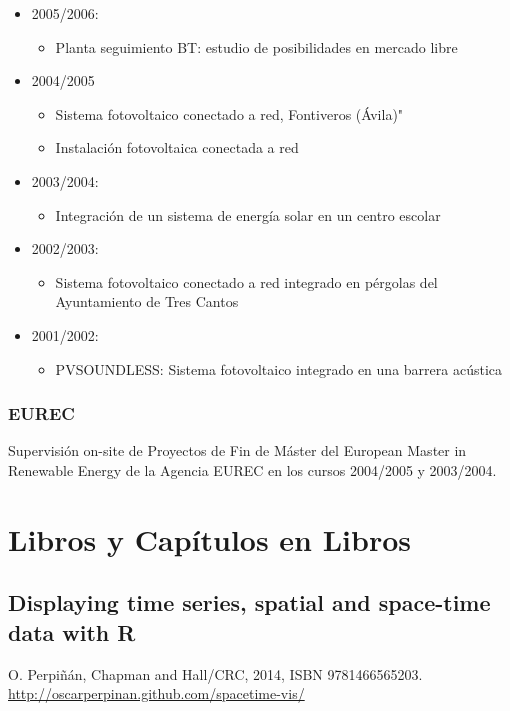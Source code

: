 \documentclass[article, a4paper]{memoir}
\begin{document}
\begin{itemize}
\begin{itemize}
\end{itemize}
\item 2005/2006:
\begin{itemize}
\item \guillemotleft{}Planta seguimiento BT: estudio de posibilidades en mercado libre\guillemotright{}
\end{itemize}
\item 2004/2005
\begin{itemize}
\item \guillemotleft{}Sistema fotovoltaico conectado a red, Fontiveros (Ávila)"
\item \guillemotleft{}Instalación fotovoltaica conectada a red\guillemotright{}
\end{itemize}
\item 2003/2004:
\begin{itemize}
\item \guillemotleft{}Integración de un sistema de energía solar en un centro escolar\guillemotright{}
\end{itemize}
\item 2002/2003:
\begin{itemize}
\item \guillemotleft{}Sistema fotovoltaico conectado a red integrado en pérgolas del Ayuntamiento de Tres Cantos\guillemotright{}
\end{itemize}
\item 2001/2002:
\begin{itemize}
\item \guillemotleft{}PVSOUNDLESS: Sistema fotovoltaico integrado en una barrera acústica\guillemotright{}
\end{itemize}
\end{itemize}

\subsubsection{EUREC}
\label{sec-5-3-3}
Supervisión on-site de Proyectos de Fin de Máster del European Master in Renewable Energy de la Agencia EUREC en los cursos 2004/2005 y 2003/2004.

\section{Libros y Capítulos en Libros}
\label{sec-6}

\subsection{Displaying time series, spatial and space-time data with R}
\label{sec-6-1}
O. Perpiñán, Chapman and Hall/CRC, 2014, ISBN 9781466565203. \url{http://oscarperpinan.github.com/spacetime-vis/}
\end{document}
